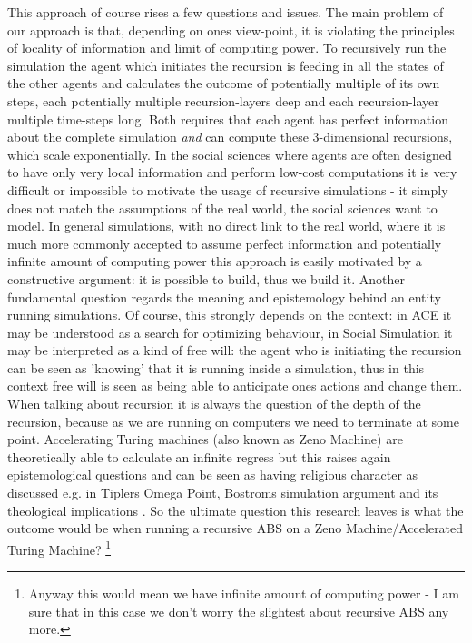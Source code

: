 This approach of course rises a few questions and issues. The main problem of our approach is that, depending on ones view-point, it is violating the principles of locality of information and limit of computing power. To recursively run the simulation the agent which initiates the recursion is feeding in all the states of the other agents and calculates the outcome of potentially multiple of its own steps, each potentially multiple recursion-layers deep and each recursion-layer multiple time-steps long. Both requires that each agent has perfect information about the complete simulation \textit{and} can compute these 3-dimensional recursions, which scale exponentially. In the social sciences where agents are often designed to have only very local information and perform low-cost computations it is very difficult or impossible to motivate the usage of recursive simulations - it simply does not match the assumptions of the real world, the social sciences want to model. In general simulations, with no direct link to the real world, where it is much more commonly accepted to assume perfect information and potentially infinite amount of computing power this approach is easily motivated by a constructive argument: it is possible to build, thus we build it.
Another fundamental question regards the meaning and epistemology behind an entity running simulations. Of course, this strongly depends on the context: in ACE it may be understood as a search for optimizing behaviour, in Social Simulation it may be interpreted as a kind of free will: the agent who is initiating the recursion can be seen as 'knowing' that it is running inside a simulation, thus in this context free will is seen as being able to anticipate ones actions and change them.
When talking about recursion it is always the question of the depth of the recursion, because as we are running on computers we need to terminate at some point. Accelerating Turing machines (also known as Zeno Machine) are theoretically able to calculate an infinite regress but this raises again epistemological questions and can be seen as having religious character as discussed e.g. in Tiplers Omega Point, Bostroms simulation argument \cite{bostrom_are_2003} and its theological implications \cite{steinhart_theological_2010}. So the ultimate question this research leaves is what the outcome would be when running a recursive ABS on a Zeno Machine/Accelerated Turing Machine? \footnote{Anyway this would mean we have infinite amount of computing power - I am sure that in this case we don't worry the slightest about recursive ABS any more.}

